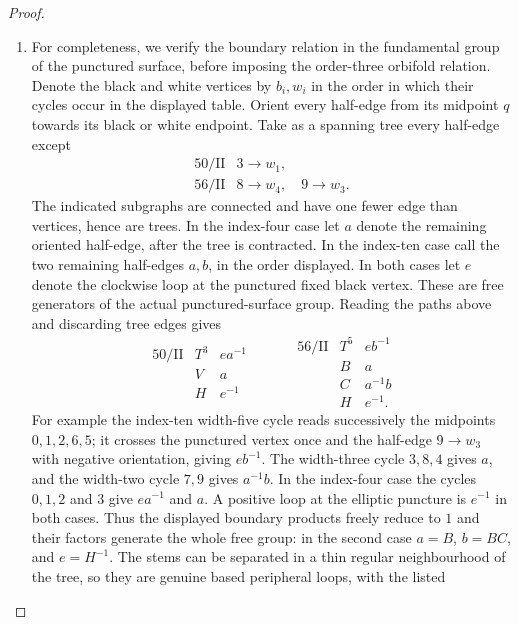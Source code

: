 \begin{proof}
\begin{enumerate}[label=\arabic*.,leftmargin=*]
\item For completeness, we verify the boundary relation in the fundamental
group of the punctured surface, before imposing the order-three
orbifold relation.  Denote the black and white vertices by $b_i,w_i$
in the order in which their cycles occur in the displayed table.
Orient every half-edge from its midpoint $q$ towards its black or
white endpoint.  Take as a spanning tree every half-edge except
\[
\begin{array}{c|l}
50/\mathrm{II}&3\longrightarrow w_1,\\
56/\mathrm{II}&8\longrightarrow w_4,\quad9\longrightarrow w_3.
\end{array}
\]
The indicated subgraphs are connected and have one fewer edge than
vertices, hence are trees.  In the index-four case let $a$ denote
the remaining oriented half-edge, after the tree is contracted.
In the index-ten case call the two remaining half-edges $a,b$, in
the order displayed.  In both cases let $e$ denote the clockwise
loop at the punctured fixed black vertex.  These are free generators
of the actual punctured-surface group.  Reading the paths above and
discarding tree edges gives
\begin{equation}\label{mapsD:repair:free-peripherals}
\begin{array}{c|ccc}
50/\mathrm{II}&T^3&e a^{-1}&\\[-3pt]
&V&a&\\[-3pt]
&H&e^{-1}&
\end{array}
\qquad
\begin{array}{c|cc}
56/\mathrm{II}&T^5&e b^{-1}\\
&B&a\\
&C&a^{-1}b\\
&H&e^{-1}.
\end{array}
\end{equation}
For example the index-ten width-five cycle reads successively the
midpoints $0,1,2,6,5$; it crosses the punctured vertex once and the
half-edge $9\to w_3$ with negative orientation, giving $eb^{-1}$.
The width-three cycle $3,8,4$ gives $a$, and the width-two cycle
$7,9$ gives $a^{-1}b$.  In the index-four case the cycles $0,1,2$
and $3$ give $ea^{-1}$ and $a$.  A positive loop at the elliptic
puncture is $e^{-1}$ in both cases.  Thus the displayed boundary
products freely reduce to $1$ and their factors generate the whole
free group: in the second case $a=B$, $b=BC$, and $e=H^{-1}$.
The stems can be separated in a thin regular neighbourhood of the
tree, so they are genuine based peripheral loops, with the listed

\end{enumerate}
\end{proof}
